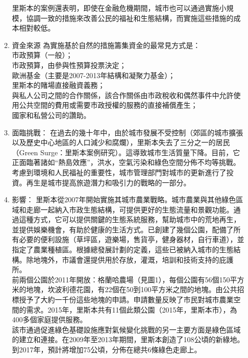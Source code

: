 \documentclass[a4paper,12pt]{article}
\begin{document}
\begin{enumerate}
\begin{enumerate}
里斯本的案例還表明，即使在金融危機期間，城市也可以通過實施小規模，協調一致的措施來改善公民的福祉和生態結構，而實施這些措施的成本相對較低。\\
\item 資金來源
\label{sec:org5599a94}
為實施基於自然的措施籌集資金的最常見方式是：\\

市政預算（一般）；\\
市政預算，由參與性預算投票決定；\\
歐洲基金（主要是2007-2013年結構和凝聚力基金）；\\
里斯本的賭場直接融資義務；\\
與私人公司之間的合作關係，該合作關係由市政稅收和偶然事件中允許使用公共空間的費用或需要市政授權的服務的直接補償產生；\\
國家和私營公司的讚助。\\
\item 面臨挑戰：
\label{sec:orge073ae2}
在過去的幾十年中，由於城市發展不受控制（郊區的城市擴張以及歷史中心地區的人口減少和腐爛），里斯本失去了三分之一的居民（Green Surge：里斯本案例研究）。這導致城市生活質量下降。目前，它正面臨著諸如“熱島效應”，洪水，空氣污染和綠色空間分佈不均等挑戰。\\

考慮到環境和人民福祉的重要性，城市管理部門對城市的更新進行了投資。再生是城市提高旅遊潛力和吸引力的戰略的一部分。\\
\item 影響：
\label{sec:orgafe9419}
里斯本從2007年開始實施其城市農業戰略。城市農業與其他綠色區域和走廊一起納入市政生態結構，可提供更好的生態流量和景觀功能。通過這種方式，它可以提供關鍵的生態系統服務，幫助城市中的荒地再生，並提供娛樂機會，有助於健康的生活方式。已創建了幾個公園，配備了所有必要的便利設施（草坪區，遊樂場，售貨亭，健身器材，自行車道），並指定了農業種植區。根據總發展計劃的定義，這些已被納入城市的生態結構。除地塊外，市議會還提供用於存放，灌溉，培訓和技術支持的庇護所。\\

前兩個公園於2011年開放：格蘭哈農場（見圖1），每個公園有56個150平方米的地塊，坎波利德花園，有22個在50到100平方米之間的地塊。由公共招標授予了大約一千份這些地塊的申請。申請數量反映了市民對城市農業空間的需求。2015年，里斯本共有11個此類公園（2015年，里斯本市），為400多個家庭提供服務。\\

該市通過促進綠色基礎設施應對氣候變化挑戰的另一主要方面是綠色區域的建立和連接。在2009年至2013年期間，里斯本創造了108公頃的新綠地。到2017年，預計將增加75公頃，分佈在總共6條綠色走廊上。\\


\end{enumerate}
\end{enumerate}
\end{document}
